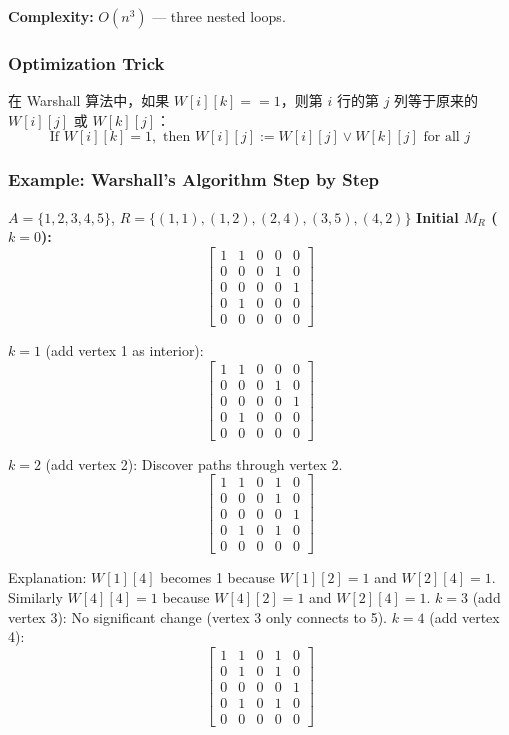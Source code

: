\documentclass[10pt,a4paper,openany]{ctexbook}
\theoremstyle{definition}
\theoremstyle{remark}
\begin{document}
\textbf{Complexity:} $O(n^3)$ — three nested loops.
\subsubsection{Optimization Trick}

在 Warshall 算法中，如果 $W[i][k] == 1$，则第 $i$ 行的第 $j$ 列等于原来的 $W[i][j]$ 或 $W[k][j]$：
\[
\text{If } W[i][k] = 1, \text{ then } W[i][j] := W[i][j] \lor W[k][j] \text{ for all } j
\]

\vspace{-2pt}

\subsubsection{Example: Warshall's Algorithm Step by Step}

$A = \{1, 2, 3, 4, 5\}$, $R = \{(1,1), (1,2), (2,4), (3,5), (4,2)\}$
\textbf{Initial $M_R$ ($k=0$):}
\[
\begin{bmatrix}
1 & 1 & 0 & 0 & 0 \\
0 & 0 & 0 & 1 & 0 \\
0 & 0 & 0 & 0 & 1 \\
0 & 1 & 0 & 0 & 0 \\
0 & 0 & 0 & 0 & 0
\end{bmatrix}
\]

\textbf{$k=1$} (add vertex 1 as interior):
\[
\begin{bmatrix}
1 & 1 & 0 & 0 & 0 \\
0 & 0 & 0 & 1 & 0 \\
0 & 0 & 0 & 0 & 1 \\
0 & 1 & 0 & 0 & 0 \\
0 & 0 & 0 & 0 & 0
\end{bmatrix}
\]

\textbf{$k=2$} (add vertex 2): Discover paths through vertex 2.
\[
\begin{bmatrix}
1 & 1 & 0 & 1 & 0 \\
0 & 0 & 0 & 1 & 0 \\
0 & 0 & 0 & 0 & 1 \\
0 & 1 & 0 & 1 & 0 \\
0 & 0 & 0 & 0 & 0
\end{bmatrix}
\]

Explanation: $W[1][4]$ becomes 1 because $W[1][2] = 1$ and $W[2][4] = 1$. Similarly $W[4][4] = 1$ because $W[4][2] = 1$ and $W[2][4] = 1$.
\textbf{$k=3$} (add vertex 3):
No significant change (vertex 3 only connects to 5).
\textbf{$k=4$} (add vertex 4):
\[
\begin{bmatrix}
1 & 1 & 0 & 1 & 0 \\
0 & 1 & 0 & 1 & 0 \\
0 & 0 & 0 & 0 & 1 \\
0 & 1 & 0 & 1 & 0 \\
0 & 0 & 0 & 0 & 0
\end{bmatrix}
\]
\end{document}
